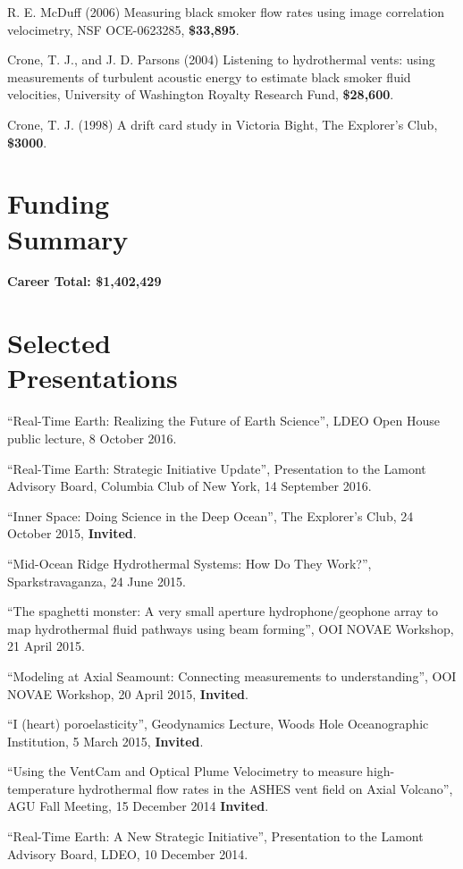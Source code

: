 \documentclass[11pt]{res}
\begin{document}
\begin{resume}
R. E. McDuff (2006) Measuring black smoker flow rates using image correlation velocimetry, NSF OCE-0623285, {\bf\$33,895}.

Crone, T. J., and J. D. Parsons (2004) Listening to hydrothermal vents: using measurements of turbulent acoustic energy to estimate black smoker fluid velocities, University of Washington Royalty Research Fund, {\bf\$28,600}.

Crone, T. J. (1998) A drift card study in Victoria Bight, The Explorer's Club, {\bf\$3000}.

\section{\sc Funding\\Summary}
{\bf Career Total: \$1,402,429}
\vspace{0.2in}

\section{\sc Selected\\Presentations}

``Real-Time Earth: Realizing the Future of Earth Science'', LDEO Open House public lecture, 8 October 2016.

``Real-Time Earth: Strategic Initiative Update'', Presentation to the Lamont Advisory Board, Columbia Club of New York, 14 September 2016.

``Inner Space: Doing Science in the Deep Ocean'', The Explorer's Club, 24 October 2015, {\bf Invited}.

``Mid-Ocean Ridge Hydrothermal Systems: How Do They Work?'', Sparkstravaganza, 24 June 2015.

``The spaghetti monster: A very small aperture hydrophone/geophone array to map hydrothermal fluid pathways using beam forming'', OOI NOVAE Workshop, 21 April 2015.

``Modeling at Axial Seamount: Connecting measurements to understanding'', OOI NOVAE Workshop, 20 April 2015, {\bf Invited}.

``I (heart) poroelasticity'', Geodynamics Lecture, Woods Hole Oceanographic Institution, 5 March 2015, {\bf Invited}.

``Using the VentCam and Optical Plume Velocimetry to measure high-temperature hydrothermal flow rates in the ASHES vent field on Axial Volcano'', AGU Fall Meeting, 15 December 2014 {\bf Invited}.

``Real-Time Earth: A New Strategic Initiative'', Presentation to the Lamont Advisory Board, LDEO, 10 December 2014.


\end{resume}
\end{document}
